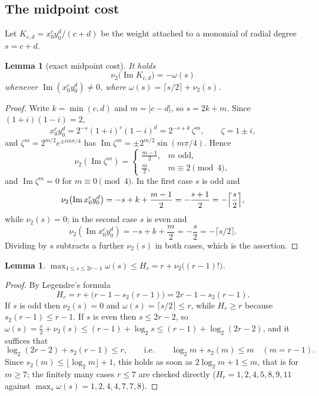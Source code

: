 \documentclass[12pt]{amsart}
\newtheorem{lemma}[theorem]{Lemma}
\theoremstyle{definition}
\theoremstyle{remark}
\begin{document}
\subsection{The midpoint cost}

Let $K_{c,d}=x_0^cy_0^d/(c+d)$ be the weight attached to a monomial of radial degree $s=c+d$.

\begin{lemma}[exact midpoint cost]\label{lem:cost}
It holds
\[
\nu_2\bigl(\operatorname{Im}K_{c,d}\bigr)=-\omega(s)
\]
whenever $\operatorname{Im}(x_0^cy_0^d)\ne0$, where $\omega(s)=\lceil s/2\rceil+\nu_2(s)$.
\end{lemma}

\begin{proof}
Write $k=\min(c,d)$ and $m=|c-d|$, so $s=2k+m$.  Since $(1+i)(1-i)=2$,
\[
  x_0^cy_0^d=2^{-s}(1+i)^c(1-i)^d=2^{-s+k}\,\zeta^{m},  \qquad \zeta=1\pm i ,
\]
and $\zeta^m=2^{m/2}e^{\pm im\pi/4}$ has $\operatorname{Im}\zeta^m=\pm2^{m/2}\sin(m\pi/4)$.  Hence
\[
\nu_2(\operatorname{Im}\zeta^m) = \begin{cases} \frac{m-1}2,  & m \text{ odd}, \\  \frac m2, & m\equiv2\pmod4, \end{cases}
\]
  and $\operatorname{Im}\zeta^m=0$ for $m\equiv0\pmod4$.  In the first case $s$ is odd and
\[
  \nu_2\bigl(\operatorname{Im}x_0^cy_0^d\bigr)  =-s+k+\frac{m-1}2=-\frac{s+1}2=-\Bigl\lceil\frac s2\Bigr\rceil ,
\]
while $\nu_2(s)=0$; in the second case $s$ is even and
\[
\nu_2(\operatorname{Im}x_0^cy_0^d)=-s+k+\frac m2=-\frac s2 =-\lceil s/2\rceil.
\]
Dividing by $s$ subtracts a further $\nu_2(s)$ in both cases, which is the assertion.
\end{proof}

\begin{lemma}\label{lem:omega}
$\max_{1\le s\le 2r-1}\omega(s)\le H_r=r+\nu_2\bigl((r-1)!\bigr)$.
\end{lemma}

\begin{proof}
By Legendre's formula
\[
H_r=r+\bigl(r-1-s_2(r-1)\bigr)=2r-1-s_2(r-1).
\]
If $s$ is odd then $\nu_2(s)=0$ and $\omega(s)=\lceil s/2\rceil\le r$, while $H_r\ge r$ because $s_2(r-1)\le r-1$.  If $s$ is even then $s\le2r-2$, so
$\omega(s)=\frac s2+\nu_2(s)\le(r-1)+\log_2 s\le(r-1)+\log_2(2r-2)$, and it suffices that
\[
  \log_2(2r-2)+s_2(r-1)\le r ,
  \qquad\text{i.e.}\qquad \log_2m+s_2(m)\le m\quad(m=r-1).
\]
Since $s_2(m)\le\lfloor\log_2m\rfloor+1$, this holds as soon as $2\log_2m+1\le m$, that is for $m\ge7$; the finitely many cases $r\le7$ are
checked directly ($H_r=1,2,4,5,8,9,11$ against $\max_s\omega(s)=1,2,4,4,7,7,8$).
\end{proof}
\end{document}
